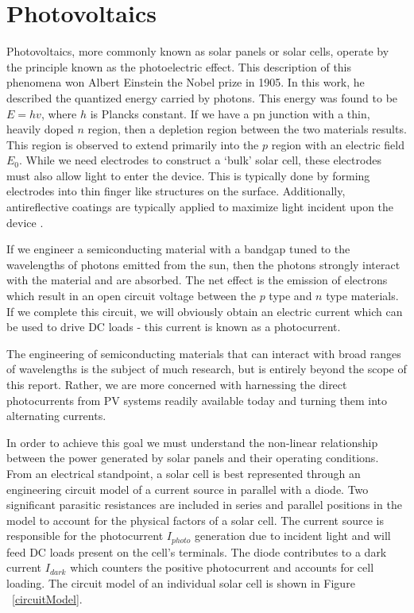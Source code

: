 \section{Photovoltaics}
Photovoltaics, more commonly known as solar panels or solar cells, operate by the principle known as the photoelectric effect. This description of this phenomena won Albert Einstein the Nobel prize in 1905. In this work, he described the quantized energy carried by photons. This energy was found to be $E=hv$, where $h$ is Plancks constant. If we have a pn junction with a thin, heavily doped $n$ region, then a depletion region between the two materials results. This region is observed to extend primarily into the $p$ region with an electric field $E_0$. While we need electrodes to construct a `bulk' solar cell, these electrodes must also allow light to enter the device. This is typically done by forming electrodes into thin finger like structures on the surface. Additionally, antireflective coatings are typically applied to maximize light incident upon the device \cite{materials}.

If we engineer a semiconducting material with a bandgap tuned to the wavelengths of photons emitted from the sun, then the photons strongly interact with the material and are absorbed. The net effect is the emission of electrons which result in an open circuit voltage between the $p$ type and $n$ type materials. If we complete this circuit, we will obviously obtain an electric current which can be used to drive DC loads - this current is known as a photocurrent. 

The engineering of semiconducting materials that can interact with broad ranges of wavelengths is the subject of much research, but is entirely beyond the scope of this report. Rather, we are more concerned with harnessing the direct photocurrents from PV systems readily available today and turning them into alternating currents. 

In order to achieve this goal we must understand the non-linear relationship between the power generated by solar panels and their operating conditions. From an electrical standpoint, a solar cell is best represented through an engineering circuit model of a current source in parallel with a diode. Two significant parasitic resistances are included in series and parallel positions in the model to account for the physical factors of a solar cell. The current source is responsible for the photocurrent $I_{photo}$ generation due to incident light and will feed DC loads present on the cell's terminals. The diode contributes to a dark current $I_{dark}$ which counters the positive photocurrent and accounts for cell loading. The circuit model of an individual solar cell is shown in Figure ~\ref{circuitModel}. \cite{soteris}

